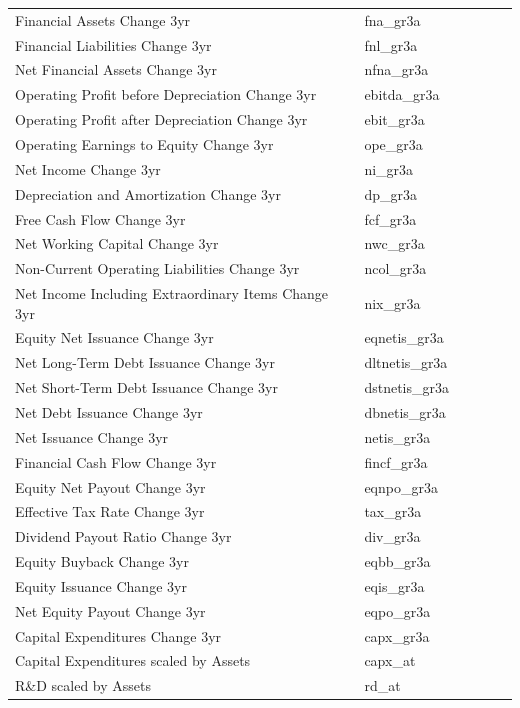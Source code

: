 \documentclass[12pt,title,fleqn]{article}
\begin{document}
\begin{longtable}{p{5cm}p{2cm}p{5cm}lll}
Financial Assets Change 3yr & fna\_gr3a & & & & \\
Financial Liabilities Change 3yr & fnl\_gr3a & & & & \\
Net Financial Assets Change 3yr & nfna\_gr3a & & & & \\
Operating Profit before Depreciation Change 3yr & ebitda\_gr3a & & & & \\
Operating Profit after Depreciation Change 3yr & ebit\_gr3a & & & & \\
Operating Earnings to Equity Change 3yr & ope\_gr3a & & & & \\
Net Income Change 3yr & ni\_gr3a & & & & \\
Depreciation and Amortization Change 3yr & dp\_gr3a & & & & \\
Free Cash Flow Change 3yr & fcf\_gr3a & & & & \\
Net Working Capital Change 3yr & nwc\_gr3a & & & & \\
Non-Current Operating Liabilities Change 3yr & ncol\_gr3a & & & & \\
Net Income Including Extraordinary Items Change 3yr & nix\_gr3a & & & & \\
Equity Net Issuance Change 3yr & eqnetis\_gr3a & & & & \\
Net Long-Term Debt Issuance Change 3yr & dltnetis\_gr3a & & & & \\
Net Short-Term Debt Issuance Change 3yr & dstnetis\_gr3a & & & & \\
Net Debt Issuance Change 3yr & dbnetis\_gr3a & & & & \\
Net Issuance Change 3yr & netis\_gr3a & & & & \\
Financial Cash Flow Change 3yr & fincf\_gr3a & & & & \\
Equity Net Payout Change 3yr & eqnpo\_gr3a & & & & \\
Effective Tax Rate Change 3yr & tax\_gr3a & & & & \\
Dividend Payout Ratio Change 3yr & div\_gr3a & & & & \\
Equity Buyback Change 3yr & eqbb\_gr3a & & & & \\
Equity Issuance Change 3yr & eqis\_gr3a & & & & \\
Net Equity Payout Change 3yr & eqpo\_gr3a & & & & \\
Capital Expenditures Change 3yr & capx\_gr3a & & & & \\
Capital Expenditures scaled by Assets & capx\_at & & & & \\
R\&D scaled by Assets & rd\_at & & & & \\

\end{longtable}
\end{document}
